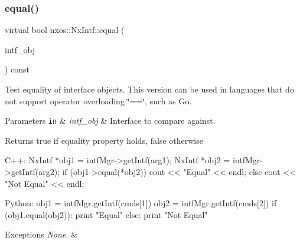 \subsubsection{\texorpdfstring{equal()}{equal()}}
{\footnotesize\ttfamily virtual bool nxos\+::\+Nx\+Intf\+::equal (\begin{DoxyParamCaption}\item[{\mbox{\hyperlink{classnxos_1_1_nx_intf}{Nx\+Intf}} const \&}]{intf\+\_\+obj }\end{DoxyParamCaption}) const\hspace{0.3cm}{\ttfamily [pure virtual]}}

Test equality of interface objects. This version can be used in languages that do not support operator overloading \char`\"{}==\char`\"{}, such as Go. 
\begin{DoxyParams}[1]{Parameters}
\mbox{\tt in}  & {\em intf\+\_\+obj} & Interface to compare against. \\
\hline
\end{DoxyParams}
\begin{DoxyReturn}{Returns}
true if equality property holds, false otherwise
\end{DoxyReturn}

\begin{DoxyCode}
C++:
     NxIntf *obj1 = intfMgr->getIntf(arg1);
     NxIntf *obj2 = intfMgr->getIntf(arg2);
         \textcolor{keywordflow}{if} (obj1->equal(*obj2))
             cout << \textcolor{stringliteral}{"Equal"} << endl;
         \textcolor{keywordflow}{else}
             cout << \textcolor{stringliteral}{"Not Equal"} << endl;

Python:
    obj1 = intfMgr.getIntf(cmds[1])
    obj2 = intfMgr.getIntf(cmds[2])
    \textcolor{keywordflow}{if} (obj1.equal(obj2)):
        print \textcolor{stringliteral}{"Equal"}
    \textcolor{keywordflow}{else}:
        print \textcolor{stringliteral}{"Not Equal"}
\end{DoxyCode}



\begin{DoxyExceptions}{Exceptions}
{\em None.} & \\
\hline
\end{DoxyExceptions}
\mbox{\label{classnxos_1_1_nx_intf_a161d3222b8e6f5dff510eef2406996fb}} 
